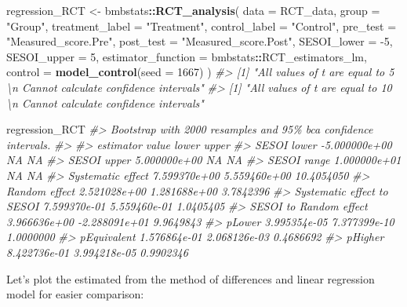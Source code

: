 \documentclass[
]{book}
\newenvironment{Shaded}{\begin{snugshade}}{\end{snugshade}}
\newcommand{\CommentTok}[1]{\textcolor[rgb]{0.56,0.35,0.01}{\textit{#1}}}
\newcommand{\DataTypeTok}[1]{\textcolor[rgb]{0.13,0.29,0.53}{#1}}
\newcommand{\DecValTok}[1]{\textcolor[rgb]{0.00,0.00,0.81}{#1}}
\newcommand{\KeywordTok}[1]{\textcolor[rgb]{0.13,0.29,0.53}{\textbf{#1}}}
\newcommand{\NormalTok}[1]{#1}
\newcommand{\OperatorTok}[1]{\textcolor[rgb]{0.81,0.36,0.00}{\textbf{#1}}}
\newcommand{\StringTok}[1]{\textcolor[rgb]{0.31,0.60,0.02}{#1}}
\begin{document}
\begin{Shaded}
\begin{Highlighting}[]
\NormalTok{regression\_RCT <{-}}\StringTok{ }\NormalTok{bmbstats}\OperatorTok{::}\KeywordTok{RCT\_analysis}\NormalTok{(}
  \DataTypeTok{data =}\NormalTok{ RCT\_data,}
  \DataTypeTok{group =} \StringTok{"Group"}\NormalTok{,}
  \DataTypeTok{treatment\_label =} \StringTok{"Treatment"}\NormalTok{,}
  \DataTypeTok{control\_label =} \StringTok{"Control"}\NormalTok{,}
  \DataTypeTok{pre\_test =} \StringTok{"Measured\_score.Pre"}\NormalTok{,}
  \DataTypeTok{post\_test =} \StringTok{"Measured\_score.Post"}\NormalTok{,}
  \DataTypeTok{SESOI\_lower =} \DecValTok{{-}5}\NormalTok{,}
  \DataTypeTok{SESOI\_upper =} \DecValTok{5}\NormalTok{,}
  \DataTypeTok{estimator\_function =}\NormalTok{ bmbstats}\OperatorTok{::}\NormalTok{RCT\_estimators\_lm,}
  \DataTypeTok{control =} \KeywordTok{model\_control}\NormalTok{(}\DataTypeTok{seed =} \DecValTok{1667}\NormalTok{)}
\NormalTok{)}
\CommentTok{\#> [1] "All values of t are equal to  5 \textbackslash{}n Cannot calculate confidence intervals"}
\CommentTok{\#> [1] "All values of t are equal to  10 \textbackslash{}n Cannot calculate confidence intervals"}


\NormalTok{regression\_RCT}
\CommentTok{\#> Bootstrap with 2000 resamples and 95\% bca confidence intervals.}
\CommentTok{\#> }
\CommentTok{\#>                   estimator         value         lower      upper}
\CommentTok{\#>                 SESOI lower {-}5.000000e+00            NA         NA}
\CommentTok{\#>                 SESOI upper  5.000000e+00            NA         NA}
\CommentTok{\#>                 SESOI range  1.000000e+01            NA         NA}
\CommentTok{\#>           Systematic effect  7.599370e+00  5.559460e+00 10.4054050}
\CommentTok{\#>               Random effect  2.521028e+00  1.281688e+00  3.7842396}
\CommentTok{\#>  Systematic effect to SESOI  7.599370e{-}01  5.559460e{-}01  1.0405405}
\CommentTok{\#>      SESOI to Random effect  3.966636e+00 {-}2.288091e+01  9.9649843}
\CommentTok{\#>                      pLower  3.995354e{-}05  7.377399e{-}10  1.0000000}
\CommentTok{\#>                 pEquivalent  1.576864e{-}01  2.068126e{-}03  0.4686692}
\CommentTok{\#>                     pHigher  8.422736e{-}01  3.994218e{-}05  0.9902346}
\end{Highlighting}
\end{Shaded}

Let's plot the estimated from the method of differences and linear regression model for easier comparison:
\end{document}
